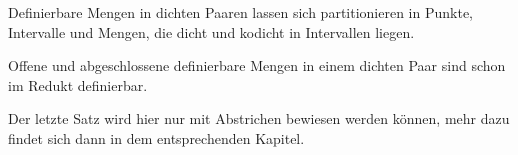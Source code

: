 \begin{satzleer}
	Definierbare Mengen in dichten Paaren lassen sich partitionieren in Punkte, Intervalle und Mengen, die dicht und kodicht in Intervallen liegen.
\end{satzleer}

\begin{satzleer}
	Offene und abgeschlossene definierbare Mengen in einem dichten Paar sind schon im Redukt definierbar.
\end{satzleer}

Der letzte Satz wird hier nur mit Abstrichen bewiesen werden können, mehr dazu findet sich dann in dem entsprechenden Kapitel.